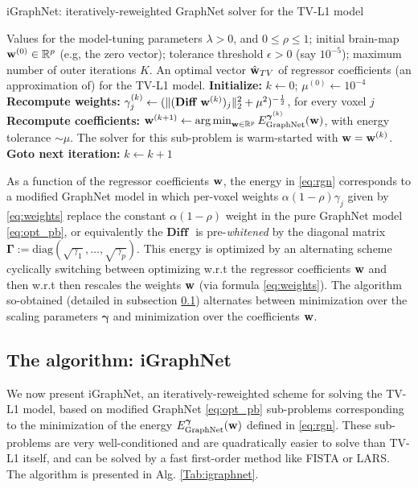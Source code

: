 \begin{algorithm}
\caption{iGraphNet: iteratively-reweighted GraphNet solver for the
  TV-L1 model}
\label{Tab:igraphnet}
\begin{algorithmic}[1]
\Require Values for the model-tuning parameters
  $\lambda > 0$, and $0 \le \rho \le 1$; initial brain-map $\mathbf{w}^{(0)}
  \in \mathbb R^p$ (e.g, the zero vector); tolerance threshold
  $\epsilon > 0$ (say $10^{-5}$); maximum number of outer iterations
  $K$.
\Ensure An optimal vector $\hat{\mathbf{w}}_{TV}$ of regressor coefficients (an approximation of)
for the TV-L1 model.
\State  \textbf{Initialize:} $k \leftarrow 0$; $\mu^{(0)} \leftarrow 10^{-4}$
\State \textbf{Recompute weights:} $\gamma_j^{(k)} \leftarrow (\|(\textbf{Diff }
\mathbf{w}^{(k)})_j\|_2^2 + {\mu}^2)^{-\frac{1}{2}}$, for every voxel $j$
\State  \textbf{Recompute coefficients:} $\mathbf{w}^{(k + 1)}
  \leftarrow \operatorname*{arg\,min}_{\mathbf{w} \in \mathbb R^p}
  E_{\text{GraphNet}}^{\boldsymbol{\gamma}^{(k)}}(\mathbf{w})$, with energy
  tolerance $\sim \mu$. The solver for this sub-problem
  is warm-started with $\mathbf{w} = \mathbf{w}^{(k)}$.
\State \textbf{Goto next iteration:} $k \leftarrow k + 1$
\EndWhile
\end{algorithmic}
\end{algorithm}

As a function of the regressor coefficients $\mathbf{w}$, the energy in
\eqref{eq:rgn} corresponds to a modified
GraphNet model in which per-voxel weights $\alpha(1 - \rho)\gamma_j$ given
by \eqref{eq:weights} replace the constant $\alpha(1 - \rho)$ weight
in the pure GraphNet model \eqref{eq:opt_pb}, or
equivalently the $\textbf{Diff }$ is pre-\textit{whitened} by the diagonal
matrix $\boldsymbol{\Gamma} := \mathrm{diag}(\sqrt{\gamma_1},\ldots,\sqrt{\gamma_p})$. This energy
is optimized by an alternating scheme cyclically switching between
optimizing w.r.t the regressor coefficients $\mathbf{w}$ and then w.r.t
then rescales the weights $\mathbf{w}$ (via formula \eqref{eq:weights}). The algorithm
so-obtained (detailed in subsection \ref{sec:algo}) alternates between minimization over the scaling parameters $\boldsymbol{\gamma}$ and minimization over the coefficients $\mathbf{w}$.
\subsection{The algorithm: iGraphNet}
\label{sec:algo}
We now present iGraphNet, an iteratively-reweighted scheme for
solving the TV-L1 model, based on modified GraphNet \eqref{eq:opt_pb}
sub-problems corresponding to the minimization of the energy
$E_{\text{GraphNet}}^{\boldsymbol{\gamma}}(\mathbf{w})$ defined in
\eqref{eq:rgn}. These sub-problems  are very well-conditioned and are
quadratically easier to solve than TV-L1 itself, and can be solved by
a fast first-order method like FISTA or LARS. The algorithm is presented in
Alg. \ref{Tab:igraphnet}.


